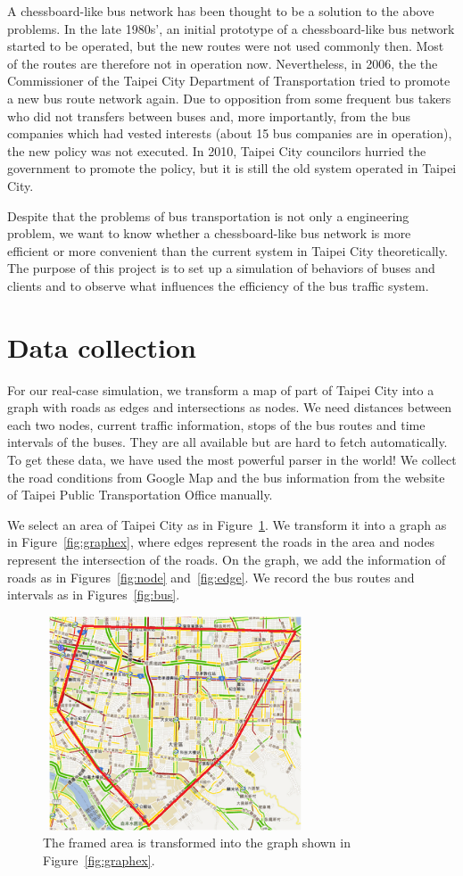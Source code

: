 \documentclass{sig-alternate}
\begin{document}
A chessboard-like bus network has been thought to be a solution to the above problems.
In the late 1980s', an initial prototype of a chessboard-like bus network started to be operated, but the new routes were not used commonly then.
Most of the routes are therefore not in operation now.
Nevertheless, in 2006, the the Commissioner of the Taipei City Department of Transportation tried to promote a new bus route network again.
Due to opposition from some frequent bus takers who did not transfers between buses and, more importantly, from the bus companies which had vested interests (about 15 bus companies are in operation), the new policy was not executed.
In 2010, Taipei City councilors hurried the government to promote the policy, but it is still the old system operated in Taipei City.

Despite that the problems of bus transportation is not only a engineering problem, we want to know whether a chessboard-like bus network is more efficient or more convenient than the current system in Taipei City theoretically.
The purpose of this project is to set up a simulation of behaviors of buses and clients and to observe what influences the efficiency of the bus traffic system.

\section{Data collection}
For our real-case simulation, we transform a map of part of Taipei City into a graph with roads as edges and intersections as nodes.
We need distances between each two nodes, current traffic information, stops of the bus routes and time intervals of the buses.
They are all available but are hard to fetch automatically.
To get these data, we have used the most powerful parser in the world!
We collect the road conditions from Google Map and the bus information from the website of Taipei Public Transportation Office manually.

We select an area of Taipei City as in Figure~\ref{fig:tpemap}.
We transform it into a graph as in Figure~\ref{fig:graphex}, where edges represent the roads in the area and nodes represent the intersection of the roads.
On the graph, we add the information of roads as in Figures~\ref{fig:node} and~\ref{fig:edge}.
We record the bus routes and intervals as in Figures~\ref{fig:bus}.

\begin{figure}
\centering
\includegraphics[height=2.5in, width=3.1in]{taipeimap.eps}
\caption{The framed area is transformed into the graph shown in Figure~\ref{fig:graphex}.}
\label{fig:tpemap}
\end{figure}
\end{document}
